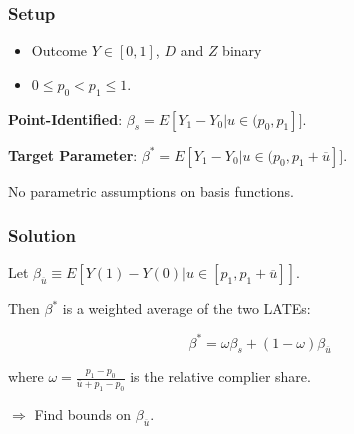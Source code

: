\documentclass[11pt, aspectratio=169]{beamer}
\begin{document}
\begin{frame}
    \frametitle{Setup}

    \begin{itemize}
        \item Outcome $Y \in [0,1]$, $D$ and $Z$ binary
        \item $0 \leq p_0 < p_1 \leq 1$.
    \end{itemize}

    \vspace{0.5cm}

    \textbf{Point-Identified}: $\beta_s = E[Y_1 - Y_0 | u \in (p_0, p_1]]$.

    \vspace{0.5cm}

    \textbf{Target Parameter}: $\beta^* = E[Y_1 - Y_0 | u \in (p_0, p_1 + \overline{u}]]$.

    \vspace{0.5cm}

    No parametric assumptions on basis functions.

\end{frame}

\begin{frame}
    \frametitle{Solution}

    Let $\beta_{\overline{u}} \equiv E[Y(1) - Y(0) | u \in [p_1, p_1 + \overline{u}]]$.

    \vspace{0.5cm}

    Then $\beta^*$ is a weighted average of the two LATEs:\@

    \begin{equation*}
        \beta^* = \omega\beta_s + (1-\omega)\beta_{\overline{u}}
    \end{equation*}

    where $\omega = \frac{p_1 - p_0}{\overline{u} + p_1 - p_0}$ is the relative complier share.

    \vspace{0.5cm}

    $\Rightarrow$ Find bounds on $\beta_{\overline{u}}$.

\end{frame}
\end{document}
